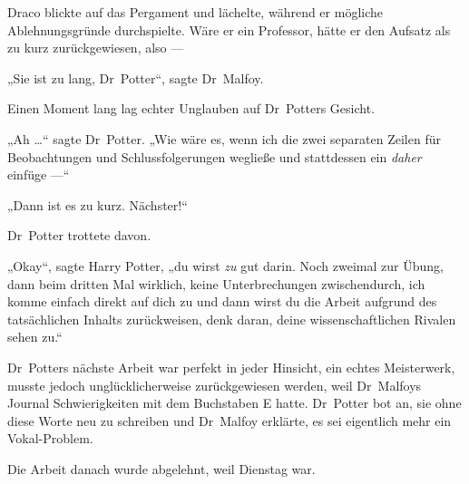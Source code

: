 Draco blickte auf das Pergament und lächelte, während er mögliche Ablehnungsgründe durchspielte. Wäre er ein Professor, hätte er den Aufsatz als zu kurz zurückgewiesen, also —

„Sie ist zu lang, Dr~Potter“, sagte Dr~Malfoy.

Einen Moment lang lag echter Unglauben auf Dr~Potters Gesicht.

„Ah …“ sagte Dr~Potter.
„Wie wäre es, wenn ich die zwei separaten Zeilen für Beobachtungen und Schlussfolgerungen wegließe und stattdessen ein \emph{daher} einfüge —“

„Dann ist es zu kurz. Nächster!“

Dr~Potter trottete davon.

„Okay“, sagte Harry Potter, „du wirst \emph{zu} gut darin. Noch zweimal zur Übung, dann beim dritten Mal wirklich, keine Unterbrechungen zwischendurch, ich komme einfach direkt auf dich zu und dann wirst du die Arbeit aufgrund des tatsächlichen Inhalts zurückweisen, denk daran, deine wissenschaftlichen Rivalen sehen zu.“

Dr~Potters nächste Arbeit war perfekt in jeder Hinsicht, ein echtes Meisterwerk, musste jedoch unglücklicherweise zurückgewiesen werden, weil Dr~Malfoys Journal Schwierigkeiten mit dem Buchstaben E hatte. Dr~Potter bot an, sie ohne diese Worte neu zu schreiben und Dr~Malfoy erklärte, es sei eigentlich mehr ein Vokal-Problem.

Die Arbeit danach wurde abgelehnt, weil Dienstag war.

